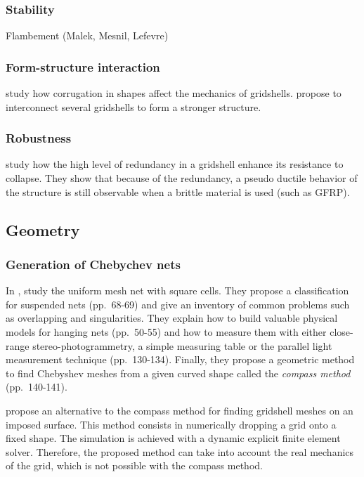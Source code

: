 \subsubsection{Stability}
Flambement (Malek, Mesnil, Lefevre)
\citet{Mesnil2013}
\citet{Mesnil2015a}
\citet{Mesnil2017a}
\citet{Lefevre2015}

\cite{Toussaint2007}

\subsubsection{Form-structure interaction}
 study how corrugation in shapes affect the mechanics of gridshells.
 propose to interconnect several gridshells to form a stronger structure.

\subsubsection{Robustness}

\citet{Tayeb2013} study how the high level of redundancy in a gridshell enhance its resistance to collapse. They show that because of the redundancy, a pseudo ductile behavior of the structure is still observable when a brittle material is used (such as GFRP).

\subsection{Geometry}
\subsubsection{Generation of Chebychev nets}

In ,  study the uniform mesh net with square cells. They propose a classification for suspended nets (pp.~68-69) and give an inventory of common problems such as overlapping and singularities. They explain how to build valuable physical models for hanging nets (pp.~50-55) and how to measure them with either close-range stereo-photogrammetry, a simple measuring table or the parallel light measurement technique (pp.~130-134). Finally, they propose a geometric method to find Chebyshev meshes from a given curved shape called the \emph{compass method} (pp.~140-141).

 propose an alternative to the compass method for finding gridshell meshes on an imposed surface. This method consists in numerically dropping a grid onto a fixed shape. The simulation is achieved with a dynamic explicit finite element solver. Therefore, the proposed method can take into account the real mechanics of the grid, which is not possible with the compass method.

